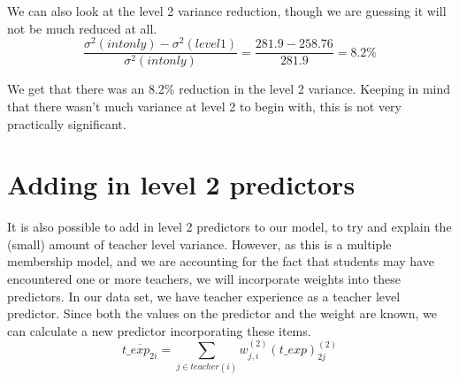 \documentclass[
]{book}
\begin{document}
We can also look at the level 2 variance reduction, though we are guessing it will not be much reduced at all.
\[\frac{\sigma^{2}(intonly) - \sigma^{2}(level1)}{\sigma^{2}(intonly)} = \frac{281.9-258.76}{281.9} = 8.2\%\]

We get that there was an 8.2\% reduction in the level 2 variance. Keeping in mind that there wasn't much variance at level 2 to begin with, this is not very practically significant.

\hypertarget{adding-in-level-2-predictors}{%
\section{Adding in level 2 predictors}\label{adding-in-level-2-predictors}}

It is also possible to add in level 2 predictors to our model, to try and explain the (small) amount of teacher level variance. However, as this is a multiple membership model, and we are accounting for the fact that students may have encountered one or more teachers, we will incorporate weights into these predictors. In our data set, we have teacher experience as a teacher level predictor. Since both the values on the predictor and the weight are known, we can calculate a new predictor incorporating these items.
\[\overline{t\_exp_{2i}} = \sum_{j \in teacher(i)}w_{j,i}^{(2)}(t\_exp)_{2j}^{(2)}\]
\end{document}
